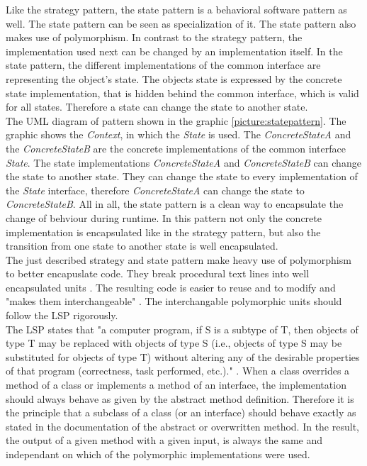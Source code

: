 
Like the strategy pattern, the state pattern is a behavioral software pattern as well. The state pattern can be seen as specialization of it. The state pattern also makes use of polymorphism. In contrast to the strategy pattern, the implementation used next can be changed by an implementation itself. In the state pattern, the different implementations of the common interface are representing the object's state. The objects state is expressed by the concrete state implementation, that is hidden behind the common interface, which is valid for all states. Therefore a state can change the state to another state.\\

The \ac{UML} diagram of pattern shown in the graphic \ref{picture:statepattern}. The graphic shows the \textit{Context}, in which the \textit{State} is used. The \textit{ConcreteStateA} and the \textit{ConcreteStateB} are the concrete implementations of the common interface \textit{State}. The state implementations  \textit{ConcreteStateA} and \textit{ConcreteStateB} can change the state to another state. They can change the state to every implementation of the \textit{State} interface, therefore \textit{ConcreteStateA} can change the state to \textit{ConcreteStateB}.
All in all, the state pattern is a clean way to encapsulate the change of behviour during runtime. In this pattern not only the concrete implementation is encapsulated like in the strategy pattern, but also the transition from one state to another state is well encapsulated. \\

The just described strategy and state pattern make heavy use of polymorphism to better encapuslate code. They break procedural text lines into well encapsulated units \cite{gof}. The resulting code is easier to reuse and to modify and "makes them interchangeable" \cite{gof}. The interchangable polymorphic units should follow the \ac{LSP} rigorously.\\

The \ac{LSP} states that "a computer program, if S is a subtype of T, then objects of type T may be replaced with objects of type S (i.e., objects of type S may be substituted for objects of type T) without altering any of the desirable properties of that program (correctness, task performed, etc.)." \cite[Liskov Substitution Principle]{wiki}. When a class overrides a method of a class or implements a method of an interface, the implementation should always behave as given by the abstract method definition. Therefore it is the principle that a subclass of a class (or an interface) should behave exactly as stated in the documentation of the abstract or overwritten method. In the result, the output of a given method with a given input, is always the same and independant on which of the polymorphic implementations were used. \\

